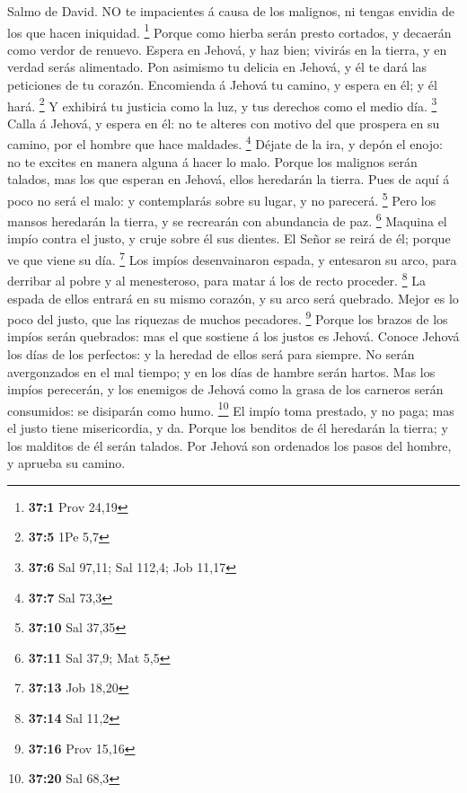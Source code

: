  Salmo de David. NO te impacientes á causa de los malignos,
ni tengas envidia de los que hacen iniquidad. \footnote{\textbf{37:1}
  Prov 24,19}  Porque como hierba serán presto cortados, y
decaerán como verdor de renuevo.  Espera en Jehová, y haz
bien; vivirás en la tierra, y en verdad serás alimentado. 
Pon asimismo tu delicia en Jehová, y él te dará las peticiones de tu
corazón.  Encomienda á Jehová tu camino, y espera en él; y
él hará. \footnote{\textbf{37:5} 1Pe 5,7}  Y exhibirá tu
justicia como la luz, y tus derechos como el medio día. \footnote{\textbf{37:6}
  Sal 97,11; Sal 112,4; Job 11,17}  Calla á Jehová, y espera
en él: no te alteres con motivo del que prospera en su camino, por el
hombre que hace maldades. \footnote{\textbf{37:7} Sal 73,3} 
Déjate de la ira, y depón el enojo: no te excites en manera alguna á
hacer lo malo.  Porque los malignos serán talados, mas los
que esperan en Jehová, ellos heredarán la tierra.  Pues de
aquí á poco no será el malo: y contemplarás sobre su lugar, y no
parecerá. \footnote{\textbf{37:10} Sal 37,35}  Pero los
mansos heredarán la tierra, y se recrearán con abundancia de paz.
\footnote{\textbf{37:11} Sal 37,9; Mat 5,5}  Maquina el
impío contra el justo, y cruje sobre él sus dientes.  El
Señor se reirá de él; porque ve que viene su día. \footnote{\textbf{37:13}
  Job 18,20}  Los impíos desenvainaron espada, y entesaron
su arco, para derribar al pobre y al menesteroso, para matar á los de
recto proceder. \footnote{\textbf{37:14} Sal 11,2}  La
espada de ellos entrará en su mismo corazón, y su arco será quebrado.
 Mejor es lo poco del justo, que las riquezas de muchos
pecadores. \footnote{\textbf{37:16} Prov 15,16}  Porque los
brazos de los impíos serán quebrados: mas el que sostiene á los justos
es Jehová.  Conoce Jehová los días de los perfectos: y la
heredad de ellos será para siempre.  No serán avergonzados
en el mal tiempo; y en los días de hambre serán hartos. 
Mas los impíos perecerán, y los enemigos de Jehová como la grasa de los
carneros serán consumidos: se disiparán como humo. \footnote{\textbf{37:20}
  Sal 68,3}  El impío toma prestado, y no paga; mas el
justo tiene misericordia, y da.  Porque los benditos de él
heredarán la tierra; y los malditos de él serán talados. 
Por Jehová son ordenados los pasos del hombre, y aprueba su camino.
